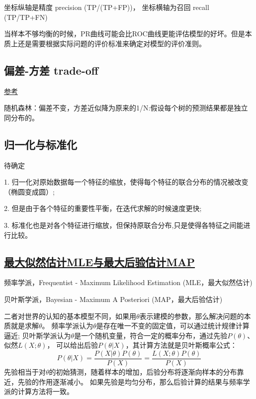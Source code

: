 {}
坐标纵轴是精度 precision (TP/(TP+FP))， 坐标横轴为召回 recall (TP/TP+FN)

当样本不够均衡的时候，PR曲线可能会比ROC曲线更能评估模型的好坏。但是本质上还是需要根据实际问题的评价标准来确定对模型的评价准则。


\subsection{偏差-方差 trade-off}
\href{https://zhuanlan.zhihu.com/p/36822575}{参考}

随机森林：偏差不变，方差近似降为原来的1/N:假设每个树的预测结果都是独立同分布的。


\subsection{归一化与标准化}
待确定

1. 归一化对原始数据每一个特征的缩放，使得每个特征的联合分布的情况被改变（椭圆变成圆）;

2. 但是由于各个特征的重要性平衡，在迭代求解的时候速度更快;

3. 标准化也是对各个特征进行缩放，但保持原联合分布,只是使得各特征之间能进行比较。

\subsection{\href{https://zhuanlan.zhihu.com/p/32480810}{最大似然估计MLE与最大后验估计MAP}}
频率学派，Frequentist - Maximum Likelihood Estimation (MLE，最大似然估计)

贝叶斯学派，Bayesian - Maximum A Posteriori (MAP，最大后验估计)

二者对世界的认知的基本模型不同，如果用$\theta$表示建模的参数，那么解决问题的本质就是求解$\theta$。
频率学派认为$\theta$是存在唯一不变的固定值，可以通过统计规律计算逼近; 
贝叶斯学派认为$\theta$是一个随机变量，符合一定的概率分布，通过先验$P(\theta)$、似然$L(X;\theta)$，
可以给出后验$P(\theta|X)$，其计算方法就是贝叶斯概率公式：
\begin{equation*}
    P(\theta|X) = \frac{P(X|\theta)P(\theta)}{P(X)} = \frac{L(X;\theta)P(\theta)}{P(X)}
\end{equation*}
先验相当于对$\theta$的初始猜测，随着样本的增加，后验分布将逐渐向样本的分布靠近，先验的作用逐渐减小。
如果先验是均匀分布，那么后验计算的结果与频率学派的计算方法将一致。

